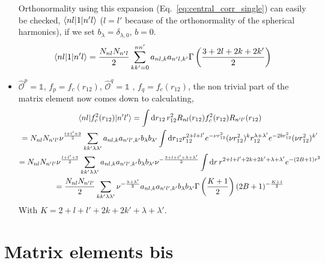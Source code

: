 \documentclass[10pt]{article}
\begin{document}
\begin{itemize}
	Orthonormality using this expansion (Eq.~\ref{eq:central_corr_single}) can easily be checked, $\braket{ n l |  1 | n' l}$ ($l=l'$ because of the orthonormality of the spherical harmonics), if we set $b_{\lambda} = \delta_{\lambda,0}$, $b=0$.
	\begin{align}
		\braket{ n l |  1 | n' l} =  \frac{N_{nl} N_{n'l}}{2}  \sum_{kk'=0}^{nn'} a_{nl,k} a_{n'l,k'} \Gamma \left( \frac{3+2l+2k + 2k'}{2} \right)
	\end{align}
	\item $\hat{\mathcal{O}}^{p} = \mathbb{1}$, $f_{p} = f_c(r_{12})$, $\hat{\mathcal{O}}^{q} = \mathbb{1}$ , $f_{q} = f_c(r_{12})$, the non trivial part of the matrix element now comes down to calculating,
	\begin{multline*}
		\braket{ n l |  f_{c}^{2}(r_{12}) | n' l'} = \int \text{d} r_{12} \, r_{12}^{2} R_{nl}(r_{12}) f_{c}^{2}(r_{12}) R_{n'l'}(r_{12}) \\
		= N_{nl} N_{n'l'} \nu^{\frac{l + l' + 3}{2}} \sum_{kk'\lambda \lambda'} a_{nl,k} a_{n'l',k'} b_{\lambda} b_{\lambda'}  \int \text{d} r_{12} r_{12}^{2+l+l'} e^{-\nu r_{12}^{2}} ( \nu r_{12}^{2} )^{k} r_{12}^{\lambda+\lambda'} e^{-2 b r_{12}^{2}} ( \nu r_{12}^{2})^{k'} \\
		= N_{nl} N_{n'l'} \nu^{\frac{l + l' + 3}{2}} \sum_{kk'\lambda \lambda'} a_{nl,k} a_{n'l',k'} b_{\lambda} b_{\lambda'} \nu^{- \frac{3 + l + l' + \lambda + \lambda'}{2}} \int \text{d} r \, r^{2+l+l'+2k+2k'+\lambda + \lambda'} e^{- ( 2B + 1) r^{2}} \\
		=  \frac{N_{nl} N_{n'l'}}{2} \sum_{kk'\lambda \lambda'} \nu^{ - \frac{\lambda + \lambda'}{2}} a_{nl,k} a_{n'l',k'} b_{\lambda} b_{\lambda'} \Gamma\left(\frac{K+1}{2}\right) (2B+1)^{-\frac{K+1}{2}}
	\end{multline*}
	With $K = 2+l+l'+2k+2k'+\lambda+\lambda'$.
\end{itemize}
\section{Matrix elements bis}
\end{document}

